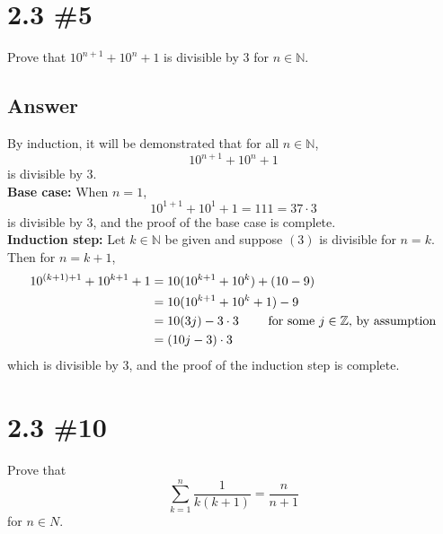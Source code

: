 \documentclass[
	12pt, %
]{fphw}
\newcommand\qed{\text{$\blacksquare$}}
\newcommand\Z{\mathbb{Z}}
\newcommand\N{\mathbb{N}}
\begin{document}

\section*{2.3 \#5}

\begin{problem}
Prove that $10^{n+1} + 10^n + 1$ is divisible by 3 for $n \in \N{}$.
\end{problem}


\subsection*{Answer} By induction, it will be demonstrated that for all $n \in \N{}$,
\begin{equation}
10^{n+1} + 10^n + 1
\end{equation}
is divisible by 3.\\
\textbf{Base case:} When $n = 1$,
$$
10^{1+1} + 10^1 + 1 = 111 = 37 \cdot 3
$$
is divisible by 3, and the proof of the base case is complete. \\
\textbf{Induction step:} Let $k \in \N{}$ be given and suppose $(3)$ is divisible for $n = k$. Then for $n = k+1$,
\begin{align*}
10^{(k+1)+1} + 10^{k+1} + 1 &= 10(10^{k+1} + 10^k) + (10 - 9) \\
&=10(10^{k+1} + 10^k + 1) - 9 \\
&= 10 (3j) - 3 \cdot 3 \hspace{20 pt} \text{ for some $j \in \Z{}$, by assumption}\\
&= (10j - 3)\cdot 3
\end{align*}
which is divisible by 3, and the proof of the induction step is complete. \qed


\section*{2.3 \#10}

\begin{problem}
Prove that
$$
\sum^n_{k = 1} \frac{1}{k(k+1)} = \frac{n}{n+1}
$$
for $n \in N{}$.
\end{problem}

\end{document}

